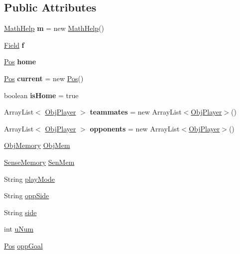 \subsection*{Public Attributes}
\begin{DoxyCompactItemize}
\item 
\hypertarget{classMemory_afb5e10d7716ba7cb3c3e0a3a4b336a8f}{
\hyperlink{classMathHelp}{MathHelp} {\bfseries m} = new \hyperlink{classMathHelp}{MathHelp}()}
\label{classMemory_afb5e10d7716ba7cb3c3e0a3a4b336a8f}

\item 
\hypertarget{classMemory_ab55dd7b896a2c05e64109215ecb67b45}{
\hyperlink{classField}{Field} {\bfseries f}}
\label{classMemory_ab55dd7b896a2c05e64109215ecb67b45}

\item 
\hypertarget{classMemory_a600689cf6d1edd272c50b71b413bf0b6}{
\hyperlink{classPos}{Pos} {\bfseries home}}
\label{classMemory_a600689cf6d1edd272c50b71b413bf0b6}

\item 
\hypertarget{classMemory_a6bb98a089f2b73c6e35c73d37fcaa91b}{
\hyperlink{classPos}{Pos} {\bfseries current} = new \hyperlink{classPos}{Pos}()}
\label{classMemory_a6bb98a089f2b73c6e35c73d37fcaa91b}

\item 
\hypertarget{classMemory_a3851e9c9410407dec042905dfb3a097e}{
boolean {\bfseries isHome} = true}
\label{classMemory_a3851e9c9410407dec042905dfb3a097e}

\item 
\hypertarget{classMemory_a775861ea1cd61b8d77f5c2c9212d7088}{
ArrayList$<$ \hyperlink{classObjPlayer}{ObjPlayer} $>$ {\bfseries teammates} = new ArrayList$<$\hyperlink{classObjPlayer}{ObjPlayer}$>$()}
\label{classMemory_a775861ea1cd61b8d77f5c2c9212d7088}

\item 
\hypertarget{classMemory_a2f4179e0c17d45dbae6340c753d3d811}{
ArrayList$<$ \hyperlink{classObjPlayer}{ObjPlayer} $>$ {\bfseries opponents} = new ArrayList$<$\hyperlink{classObjPlayer}{ObjPlayer}$>$()}
\label{classMemory_a2f4179e0c17d45dbae6340c753d3d811}

\item 
\hyperlink{classObjMemory}{ObjMemory} \hyperlink{classMemory_a0275565eade385f502f6c132f861f11f}{ObjMem}
\item 
\hyperlink{classSenseMemory}{SenseMemory} \hyperlink{classMemory_a5a5e28abf688e0a18930e5dbdbc807b2}{SenMem}
\item 
String \hyperlink{classMemory_a96f2cc811ed87dfd6056fccd9c10ca40}{playMode}
\item 
String \hyperlink{classMemory_a966a412595e961d93cf7404efda0db9c}{oppSide}
\item 
String \hyperlink{classMemory_ac56cee169ca4e880744065f25f306b82}{side}
\item 
int \hyperlink{classMemory_a62572ea10a84193a66c33ecd43c252f7}{uNum}
\item 
\hyperlink{classPos}{Pos} \hyperlink{classMemory_afb4aa82077de0c1642e4d3dbf0619615}{oppGoal}
\end{DoxyCompactItemize}


